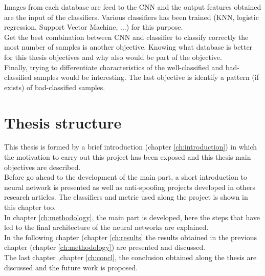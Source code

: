 Images from each database are feed to the CNN and the output features obtained are the input of the classifiers. Various classifiers has been trained (KNN, logistic regression, Support Vector Machine, ...) for this purpose.\\

Get the best combination between CNN and classifier to classify correctly the most number of samples is another objective. Knowing what database is better for this thesis objectives and why also would be part of the objective.\\

Finally, trying to differentiate characteristics of the well-classified and bad-classified samples would be interesting. The last objective is identify a pattern (if exists) of bad-classified samples.\\

\section{Thesis structure}
This thesis is formed by a brief introduction (chapter \ref{ch:introduction}) in which the motivation to carry out this project has been exposed and this thesis main objectives are described.\\

Before go ahead to the development of the main part, a short introduction to neural network is presented as well as anti-spoofing projects developed in others research articles. The classifiers and metric used along the project is shown in this chapter too.\\

In chapter \ref{ch:methodology}, the main part is developed, here the steps that have led to the final architecture of the neural networks are explained.\\

In the following chapter (chapter \ref{ch:results} the results obtained in the previous chapter (chapter \ref{ch:methodology}) are presented and discussed.\\

The last chapter ,chapter \ref{ch:concl}, the conclusion obtained along the thesis are discussed and the future work is proposed.\\

 
  